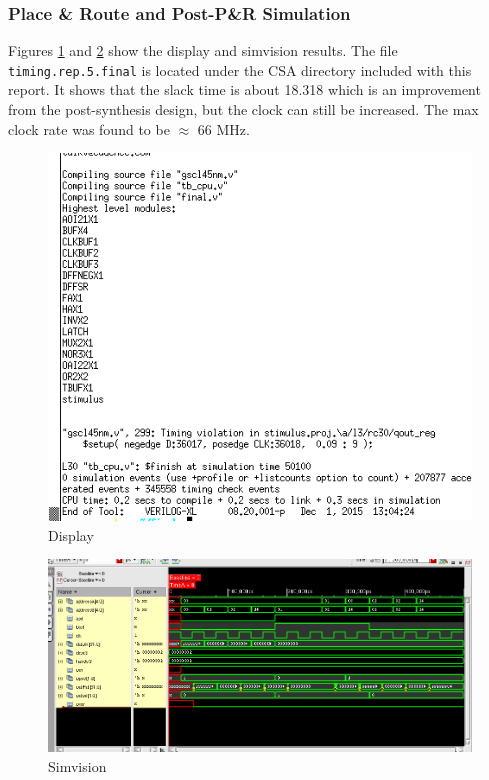 \documentclass[12pt]{article}
\begin{document}
\subsubsection{Place \& Route and Post-P\&R Simulation}
Figures \ref{fig:EC-text-CSA} and \ref{fig:EC-test-CSA} show the display and simvision results. The file \texttt{timing.rep.5.final} is located under the CSA directory included with this report. It shows that the slack time is about 18.318 which is an improvement from the post-synthesis design, but the clock can still be increased. The max clock rate was found to be $\approx$ 66 MHz.
\begin{figure}[H]
\centering
\includegraphics[width=.7\linewidth]{../CSA/EC-text}
\caption{Display}
\label{fig:EC-text-CSA}
\end{figure}
\begin{figure}[H]
\centering
\includegraphics[width=.7\linewidth]{../CSA/EC}
\caption{Simvision}
\label{fig:EC-test-CSA}
\end{figure}
\end{document}
